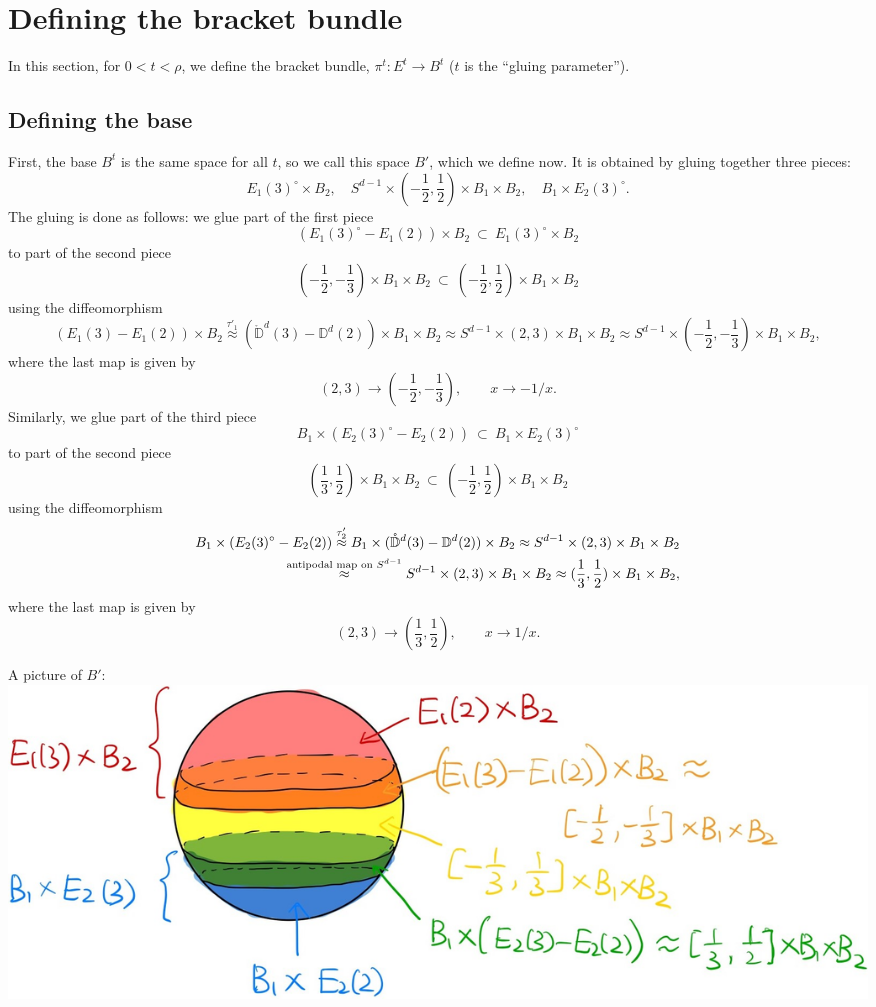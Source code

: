\documentclass[11pt]{article}
\theoremstyle{definition}
\theoremstyle{remark}
\def\mr#1{{\mathring{#1}}}
\def\D{\mathbb{D}}
\def\tn#1{\textnormal{#1}}
\begin{document}
\section{Defining the bracket bundle}
\label{bracketbundle_sec}

In this section, for $0<t<\rho$, we define the bracket bundle, $\pi^t:E^t\to B^t$ ($t$ is the ``gluing parameter''). 

\subsection{Defining the base}\label{Bt_sec}
First, the base $B^t$ is the same space for all $t$, so we call this space $B'$, which we define now. 
It is obtained by gluing together three pieces: \begin{equation}\label{piecesB_eqn}
{E_1(3)^\circ}\times B_2,\quad S^{d-1}\times (-\frac{1}{2},\frac{1}{2})\times B_1\times B_2,\quad B_1\times {E_2(3)^\circ}.
\end{equation}
The gluing is done as follows: 
we glue part of the first piece 
$$({E_1(3)^\circ}-E_1(2))\times B_2 \ \subset\  E_1(3)^\circ\times B_2$$
to part of the second piece 
$$(-\frac{1}{2},-\frac{1}{3})\times B_1\times B_2\ \subset\  (-\frac{1}{2},\frac{1}{2})\times B_1\times B_2$$
using the diffeomorphism
$$(E_1(3)-E_1(2))\times B_2\stackrel{\tau'_1}{\approx} (\mr\D^d(3)-\D^d(2))\times B_1\times B_2\approx S^{d-1}\times(2,3)\times B_1\times B_2\approx S^{d-1}\times(-\frac{1}{2},-\frac{1}{3})\times B_1\times B_2,$$
where the last map is given by 
$$(2,3)\to(-\frac{1}{2},-\frac{1}{3}),\qquad x\to -1/x.$$
Similarly, we glue part of the third piece 
$$B_1\times(E_2(3)^\circ-E_2(2))\ \subset\ B_1\times E_2(3)^\circ$$
to part of the second piece 
$$(\frac{1}{3},\frac{1}{2})\times B_1\times B_2\ \subset\  (-\frac{1}{2},\frac{1}{2})\times B_1\times B_2$$
using the diffeomorphism 
\begin{align*}
B_1\times(E_2(3)^\circ-E_2(2))\stackrel{\tau'_2}{\approx}B_1\times(\mr\D^d(3)-\D^d(2))\times B_2\approx S^{d-1}\times(2,3)\times B_1\times B_2\\
\stackrel{\tn{antipodal map on }S^{d-1}}{\approx}S^{d-1}\times(2,3)\times B_1\times B_2\approx(\frac{1}{3},\frac{1}{2})\times B_1\times B_2,
\end{align*}
where the last map is given by 
$$(2,3)\to(\frac{1}{3},\frac{1}{2}),\qquad x\to 1/x.$$

A picture of $B'$: 
\includegraphics[scale=0.18]{fig2_fig}
\end{document}
